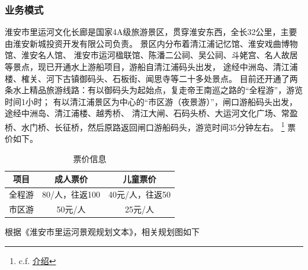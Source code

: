 \documentclass[H:\workspace\担保人财务信息2\杭州大运河\HangZhouText.tex]{subfiles}
\begin{document}
\subsubsection{业务模式}
淮安市里运河文化长廊是国家4A级旅游景区，贯穿淮安东西，全长32公里，主要由淮安新城投资开发有限公司负责。
景区内分布着清江浦记忆馆、淮安戏曲博物馆、淮安名人馆、
淮安市运河楹联馆、陈潘二公祠、吴公祠、斗姥宫、名人故居等景点，现已开通水上游船项目，游船自清江浦码头出发，
途经中洲岛、清江浦楼、榷关、河下古镇御码头、石板街、闻思寺等二十多处景点。
目前还开通了两条水上精品旅游线路：有以御码头为起始点，复走帝王南巡之路的“全程游”，游览时间1小时；
有以清江浦景区为中心的“市区游（夜景游）”，闸口游船码头出发，途经中洲岛、清江浦楼、越秀桥、
清江大闸、石码头桥、大运河文化广场、常盈桥、水门桥、长征桥，然后原路返回闸口游船码头，游览时间35分钟左右。
\footnote{c.f. \href{http://www.hactg.com/index.php?c=article&id=509}{介绍}}
票价如下。
\vspace{-1em}
\begin{table}[H]
    \centering 
    \xiaowuhao 
    \setlength{\tabcolsep}{1.2em} %
    {\renewcommand{\arraystretch}{0.5} %
    \begin{tabular}{@{}c|c|c@{}}
        \toprule[0.05cm]
        项目 & 成人票价 & 儿童票价 \\
        \midrule[0.025cm]
        全程游 & 80/人，往返100 & 40元/人，往返50 \\
        \midrule 
        市区游 & 50元/人 & 25元/人 \\
        \bottomrule 
    \end{tabular}
    }
    \caption{票价信息}
\end{table}

根据《淮安市里运河景观规划文本》，相关规划图如下 
\end{document}
